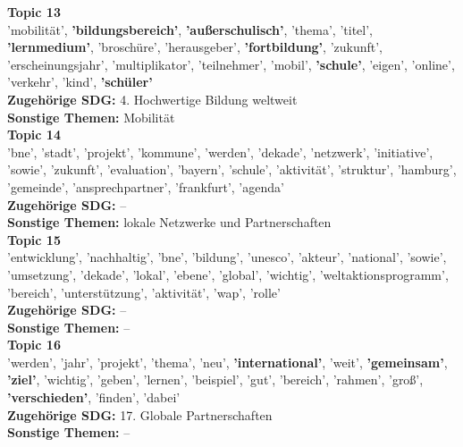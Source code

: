 \documentclass[letterpaper]{article}
\begin{document}
\textbf{Topic 13} \\
'mobilität', \textbf{'bildungsbereich'}, \textbf{'außerschulisch'}, 'thema', 'titel', \textbf{'lernmedium'}, 'broschüre', 'herausgeber', \textbf{'fortbildung'}, 'zukunft', 'erscheinungsjahr', 'multiplikator', 'teilnehmer', 'mobil', \textbf{'schule'}, 'eigen', 'online', 'verkehr', 'kind', \textbf{'schüler'} \\
    \textbf{Zugehörige SDG:} 4. Hochwertige Bildung weltweit \\
     \textbf{Sonstige Themen:} Mobilität\\
     
\textbf{Topic 14} \\
'bne', 'stadt', 'projekt', 'kommune', 'werden', 'dekade', 'netzwerk', 'initiative', 'sowie', 'zukunft', 'evaluation', 'bayern', 'schule', 'aktivität', 'struktur', 'hamburg', 'gemeinde', 'ansprechpartner', 'frankfurt', 'agenda'\\
 \textbf{Zugehörige SDG:} -- \\
\textbf{Sonstige Themen:} lokale Netzwerke und Partnerschaften\\

\textbf{Topic 15}  \\
'entwicklung', 'nachhaltig', 'bne', 'bildung', 'unesco', 'akteur', 'national', 'sowie', 'umsetzung', 'dekade', 'lokal', 'ebene', 'global', 'wichtig', 'weltaktionsprogramm', 'bereich', 'unterstützung', 'aktivität', 'wap', 'rolle'\\
    \textbf{Zugehörige SDG:} -- \\
    \textbf{Sonstige Themen:} -- \\

\textbf{Topic 16} \\
'werden', 'jahr', 'projekt', 'thema', 'neu', \textbf{'international'}, 'weit', \textbf{'gemeinsam'}, \textbf{'ziel'}, 'wichtig', 'geben', 'lernen', 'beispiel', 'gut', 'bereich', 'rahmen', 'groß', \textbf{'verschieden'}, 'finden', 'dabei'
  \\
     \textbf{Zugehörige SDG:} 17. Globale Partnerschaften\\
     \textbf{Sonstige Themen:} --\\
\end{document}
